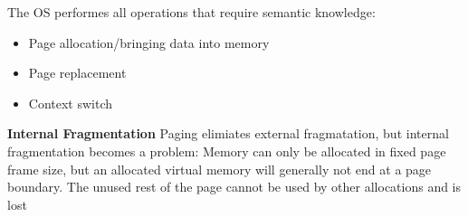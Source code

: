 \documentclass[11pt,a4paper]{article}
\begin{document}
	The OS performes all operations that require semantic knowledge:
	\begin{itemize}
		\item Page allocation/bringing data into memory
		\item Page replacement
		\item Context switch
	\end{itemize}
	
	\textbf{Internal Fragmentation} \newline
	Paging elimiates external fragmatation, but internal fragmentation becomes a problem: Memory can only be allocated in fixed page frame size, but an allocated virtual memory will generally not end at a page boundary. The unused rest of the page cannot be used by other allocations and is lost \newline
	
	
	
	
	\newpage
	
	\printglossaries
	
	
	
\end{document}

